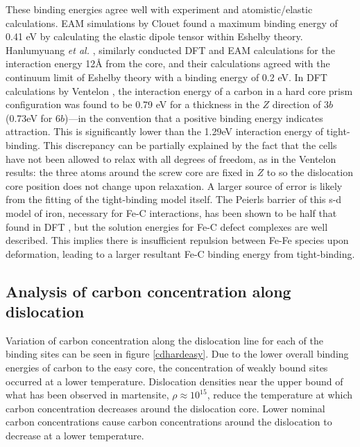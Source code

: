 \documentclass[a4paper,11pt]{article}
\begin{document}
These binding energies agree well with experiment and atomistic/elastic calculations. EAM simulations
by Clouet \cite{Clouet2008,Becquart2007} found a maximum binding energy of 0.41 eV by calculating
the elastic dipole tensor within Eshelby theory. Hanlumyuang \emph{et al.} \cite{Hanlumyuang2010},
similarly conducted DFT and EAM calculations for the interaction energy 12\AA{} from the core, and
their calculations agreed with the continuum limit of Eshelby theory with a binding energy of
0.2 eV. In DFT calculations by Ventelon \cite{Ventelon2015}, the interaction energy of a carbon in a
hard core prism configuration was found to be 0.79 eV for a thickness in the \(Z\) direction of
3\(b\) (0.73eV for \(6b\))---in the convention that a positive binding energy indicates
attraction. This is significantly lower than the 1.29eV interaction energy of tight-binding.
This discrepancy can be partially explained by the fact that the cells have not been allowed to
relax with all degrees of freedom, as in the Ventelon results: the three atoms around the screw
core are fixed in \(Z\) to so the dislocation core position does not change upon relaxation. A
larger source of error is likely from the fitting of the tight-binding model itself. The
Peierls barrier of this s-d model of iron, necessary for Fe-C interactions, has been shown to be
half that found in DFT \cite{Simpson2019}, but the solution energies for
Fe-C defect complexes are well described. This implies there is insufficient repulsion between
Fe-Fe species upon deformation, leading to a larger resultant Fe-C binding energy from tight-binding.




\subsection{Analysis of carbon concentration along dislocation}
\label{sec:org6e2c65c}

Variation of carbon concentration along the dislocation line for each of the binding sites can be
seen in figure \ref{cdhardeasy}. Due to the lower overall binding energies of carbon to the easy
core, the concentration of weakly bound sites occurred at a lower temperature. Dislocation
densities near the upper bound of what has been observed in martensite, \(\rho \approx10^{15}\), reduce
the temperature at which carbon concentration decreases around the dislocation core. Lower
nominal carbon concentrations cause carbon concentrations around the dislocation to decrease at a
lower temperature.
\end{document}
